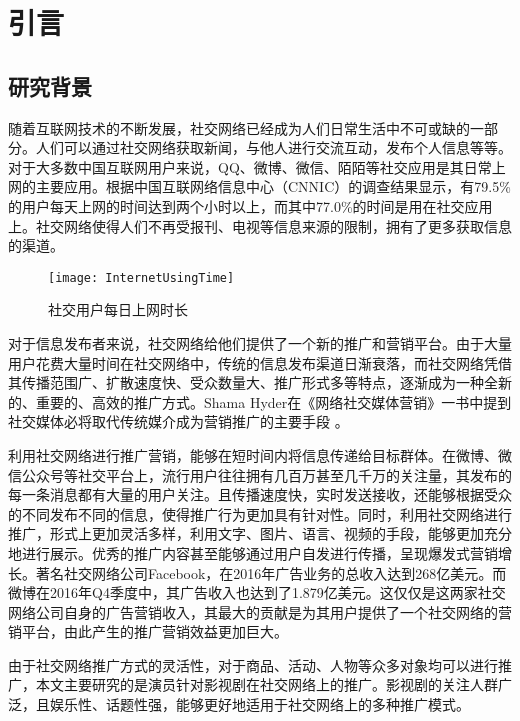 \chapter{引言}


\section{研究背景}

随着互联网技术的不断发展，社交网络已经成为人们日常生活中不可或缺的一部分。人们可以通过社交网络获取新闻，与他人进行交流互动，发布个人信息等等。对于大多数中国互联网用户来说，QQ、微博、微信、陌陌等社交应用是其日常上网的主要应用。根据中国互联网络信息中心（CNNIC）的调查结果显示\cite{internetSurvey}，有79.5\%的用户每天上网的时间达到两个小时以上，而其中77.0\%的时间是用在社交应用上。社交网络使得人们不再受报刊、电视等信息来源的限制，拥有了更多获取信息的渠道。

\begin{figure}[h] 
  \centering
  \texttt{[image: InternetUsingTime]}
  \caption{社交用户每日上网时长\cite{internetSurvey}}
  \label{InternetUsingTime}
\end{figure}

对于信息发布者来说，社交网络给他们提供了一个新的推广和营销平台。由于大量用户花费大量时间在社交网络中，传统的信息发布渠道日渐衰落，而社交网络凭借其传播范围广、扩散速度快、受众数量大、推广形式多等特点，逐渐成为一种全新的、重要的、高效的推广方式。Shama Hyder在《网络社交媒体营销》一书中提到社交媒体必将取代传统媒介成为营销推广的主要手段 \cite{hyder2016zen}。

利用社交网络进行推广营销，能够在短时间内将信息传递给目标群体。在微博、微信公众号等社交平台上，流行用户往往拥有几百万甚至几千万的关注量，其发布的每一条消息都有大量的用户关注。且传播速度快，实时发送接收，还能够根据受众的不同发布不同的信息，使得推广行为更加具有针对性。同时，利用社交网络进行推广，形式上更加灵活多样，利用文字、图片、语言、视频的手段，能够更加充分地进行展示。优秀的推广内容甚至能够通过用户自发进行传播，呈现爆发式营销增长。著名社交网络公司Facebook，在2016年广告业务的总收入达到268亿美元\cite{Facebook}。而微博在2016年Q4季度中，其广告收入也达到了1.879亿美元\cite{微博}。这仅仅是这两家社交网络公司自身的广告营销收入，其最大的贡献是为其用户提供了一个社交网络的营销平台，由此产生的推广营销效益更加巨大。

由于社交网络推广方式的灵活性，对于商品、活动、人物等众多对象均可以进行推广，本文主要研究的是演员针对影视剧在社交网络上的推广。影视剧的关注人群广泛，且娱乐性、话题性强，能够更好地适用于社交网络上的多种推广模式。

